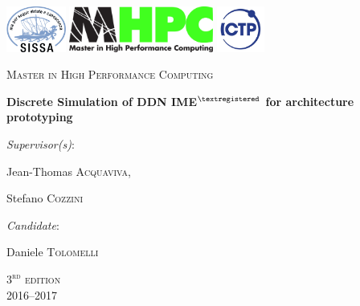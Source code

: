 \begin{titlepage}
  \begin{center}
    \vspace{1cm}
    
    \includegraphics[height=1.5cm]{sissa_logo.jpg} \hfill
    \includegraphics[height=1.5cm]{MHPClogo.pdf} \hfill
    \includegraphics[height=1.5cm]{ICTPLogo.jpg}

    \vspace{2cm}
    
    {\scshape\LARGE Master in High Performance Computing \par}

    \vspace{3.5cm}

      {\huge\bfseries Discrete Simulation of DDN IME$^{\textregistered}$ for architecture prototyping}

  \end{center}
  
  \vspace{2cm}

  \vfill

  \textit{Supervisor(s)}:\par
  Jean-Thomas \textsc{Acquaviva},\par
  Stefano \textsc{Cozzini}
  \vspace{1cm}

  \begin{flushright}
    \textit{Candidate}:\par
    Daniele \textsc{Tolomelli}
  \end{flushright}
  \vfill

  \centering

  {\large
    \textsc{$3^{\mathrm{rd}}$ edition}\\[0.1cm]
    2016--2017
  }
\end{titlepage}
